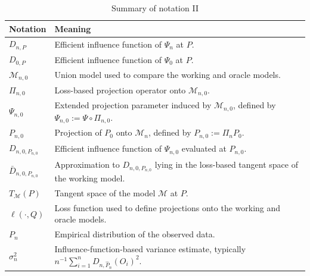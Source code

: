 \documentclass[11pt]{article}
\theoremstyle{definition}
\begin{document}
\begin{table}[H]
\centering
\caption{Summary of notation II}
\label{tab:notation2}
\begin{tabular}{p{}p{}}
\toprule
Notation & Meaning \\
\midrule
\(D_{n,P}\) & Efficient influence function of \(\Psi_n\) at \(P\). \\

\(D_{0,P}\) & Efficient influence function of \(\Psi_0\) at \(P\). \\

\(\mathcal{M}_{n,0}\) & Union model used to compare the working and oracle models. \\

\(\Pi_{n,0}\) & Loss-based projection operator onto \(\mathcal{M}_{n,0}\). \\

\(\Psi_{n,0}\) & Extended projection parameter induced by \(\mathcal{M}_{n,0}\), defined by \(\Psi_{n,0} := \Psi \circ \Pi_{n,0}\). \\

\(P_{n,0}\) & Projection of \(P_0\) onto \(\mathcal{M}_n\), defined by \(P_{n,0} := \Pi_n P_0\). \\

\(D_{n,0,P_{n,0}}\) & Efficient influence function of \(\Psi_{n,0}\) evaluated at \(P_{n,0}\). \\

\(\bar D_{n,0,P_{n,0}}\) & Approximation to \(D_{n,0,P_{n,0}}\) lying in the loss-based tangent space of the working model. \\

\(T_{\mathcal{M}}(P)\) & Tangent space of the model \(\mathcal{M}\) at \(P\). \\

\(\ell(\cdot, Q)\) & Loss function used to define projections onto the working and oracle models. \\

\(P_n\) & Empirical distribution of the observed data. \\

\(\sigma_n^2\) & Influence-function-based variance estimate, typically \(n^{-1} \sum_{i=1}^n D_{n,\widehat P_n}(O_i)^2\). \\
\bottomrule
\end{tabular}
\end{table}
\end{document}
